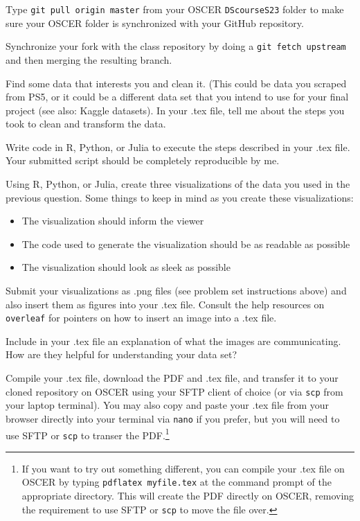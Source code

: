 \documentclass[12pt,english]{exam}
\begin{document}
\begin{questions}
\question Type \texttt{git pull origin master} from your OSCER \texttt{DScourseS23} folder to make sure your OSCER folder is synchronized with your GitHub repository. 

\question Synchronize your fork with the class repository by doing a \texttt{git fetch upstream} and then merging the resulting branch. 

\question Find some data that interests you and clean it. (This could be data you scraped from PS5, or it could be a different data set that you intend to use for your final project (see also: Kaggle datasets). In your .tex file, tell me about the steps you took to clean and transform the data.

Write code in R, Python, or Julia to execute the steps described in your .tex file. Your submitted script should be completely reproducible by me.

\question Using R, Python, or Julia, create three visualizations of the data you used in the previous question. Some things to keep in mind as you create these visualizations:
\begin{itemize}
    \item The visualization should inform the viewer
    \item The code used to generate the visualization should be as readable as possible
    \item The visualization should look as sleek as possible
\end{itemize}

Submit your visualizations as .png files (see problem set instructions above) and also insert them as figures into your .tex file. Consult the help resources on \texttt{overleaf} for pointers on how to insert an image into a .tex file.

\question Include in your .tex file an explanation of what the images are communicating. How are they helpful for understanding your data set?

\question Compile your .tex file, download the PDF and .tex file, and transfer it to your cloned repository on OSCER using your SFTP client of choice (or via \texttt{scp} from your laptop terminal). You may also copy and paste your .tex file from your browser directly into your terminal via \texttt{nano} if you prefer, but you will need to use SFTP or \texttt{scp} to transer the PDF.\footnote{If you want to try out something different, you can compile your .tex file on OSCER by typing \texttt{pdflatex myfile.tex} at the command prompt of the appropriate directory. This will create the PDF directly on OSCER, removing the requirement to use SFTP or \texttt{scp} to move the file over.}


\end{questions}
\end{document}
